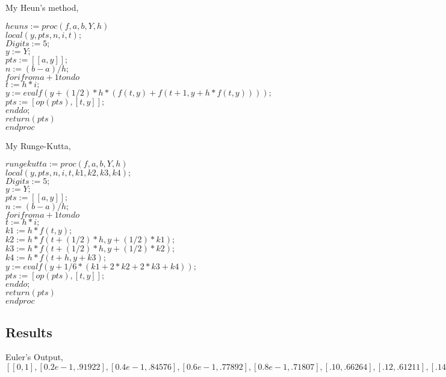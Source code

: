 \documentclass[12pt]{article}
\begin{document}
My Heun's method,

$heuns:=proc(f,a,b,Y,h)$\\
$local(y, pts, n, i, t);$\\
$Digits := 5;$\\
$y := Y;$\\
$pts := [[a, y]];$\\
$n := (b-a)/h;$\\
$for i from a+1 to n do$\\
$t := h*i;$\\
$y := evalf(y+(1/2)*h*(f(t, y)+f(t+1, y+h*f(t, y))));$\\
$pts := [op(pts), [t, y]];$\\
$end do;$\\
$return(pts)$\\
$end proc$\\
\clearpage

My Runge-Kutta,

$rungekutta:=proc(f,a,b,Y,h)$\\
$local(y, pts, n, i, t, k1, k2, k3, k4);$\\
$Digits := 5;$\\
$y := Y;$\\
$pts := [[a, y]];$\\
$n := (b-a)/h;$\\
$for i from a+1 to n do$\\
$t := h*i;$\\
$k1 := h*f(t, y);$\\
$k2 := h*f(t+(1/2)*h, y+(1/2)*k1);$\\
$k3 := h*f(t+(1/2)*h, y+(1/2)*k2);$\\
$k4 := h*f(t+h, y+k3);$\\
$y := evalf(y+1/6*(k1+2*k2+2*k3+k4));$\\
$pts := [op(pts), [t, y]];$\\
$end do;$\\
$return(pts)$\\
$end proc$\\
\subsection{Results}

Euler's Output,\\
$[[0, 1], [0.2e-1, .91922], [0.4e-1, .84576], [0.6e-1, .77892], [0.8e-1, .71807], [.10, .66264], [.12, .61211], [.14, .56601], [.16, .52393], [.18, .48549], [.20, .45035], [.22, .41819], [.24, .38875], [.26, .36176], [.28, .33701], [.30, .31429], [.32, .29341], [.34, .27420], [.36, .25652], [.38, .24022], [.40, .22518], [.42, .21130], [.44, .19847], [.46, .18659], [.48, .17559], [.50, .16539], [.52, .15592], [.54, .14712], [.56, .13893], [.58, .13131], [.60, .12420], [.62, .11757], [.64, .11137], [.66, .10558], [.68, .10016], [.70, 0.95076e-1], [.72, 0.90307e-1], [.74, 0.85829e-1], [.76, 0.81620e-1], [.78, 0.77661e-1], [.80, 0.73933e-1], [.82, 0.70419e-1], [.84, 0.67104e-1], [.86, 0.63975e-1], [.88, 0.61018e-1], [.90, 0.58222e-1], [.92, 0.55576e-1], [.94, 0.53070e-1], [.96, 0.50695e-1], [.98, 0.48443e-1], [1.00, 0.46305e-1]]$\\
\end{document}
